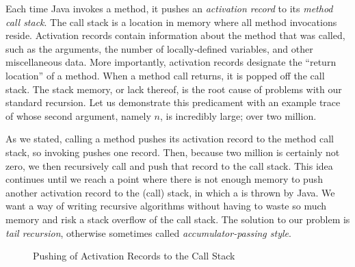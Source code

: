 Each time Java invokes a method, it pushes an \textit{activation record} to its \textit{method call stack}. The call stack is a location in memory where all method invocations reside. Activation records contain information about the method that was called, such as the arguments, the number of locally-defined variables, and other miscellaneous data. More importantly, activation records designate the ``return location'' of a method. When a method call returns, it is popped off the call stack. The stack memory, or lack thereof, is the root cause of problems with our standard recursion. Let us demonstrate this predicament with an example trace of  whose second argument, namely $n$, is incredibly large; over two million.

As we stated, calling a method pushes its activation record to the method call stack, so invoking  pushes one record. Then, because two million is certainly not zero, we then recursively call  and push that record to the call stack. This idea continues until we reach a point where there is not enough memory to push another activation record to the (call) stack, in which a  is thrown by Java. We want a way of writing recursive algorithms without having to waste so much memory and risk a stack overflow of the call stack. The solution to our problem is \textit{tail recursion}, otherwise sometimes called \textit{accumulator-passing style}.

\begin{figure}
\begin{center}
\end{center}
\caption{Pushing of  Activation Records to the Call Stack}
\end{figure}

